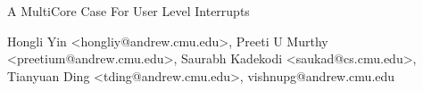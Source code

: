 \documentclass[11pt]{article}
\begin{document}
\vspace*{-5ex}\centerline{\Large A MultiCore Case For User Level Interrupts}
\vspace*{-.5ex}
\begin{center}
Hongli Yin <hongliy@andrew.cmu.edu>, Preeti U Murthy <preetium@andrew.cmu.edu>, Saurabh Kadekodi <saukad@cs.cmu.edu>, Tianyuan Ding <tding@andrew.cmu.edu>,
vishnupg@andrew.cmu.edu
\end{center}











 

\end{document}
